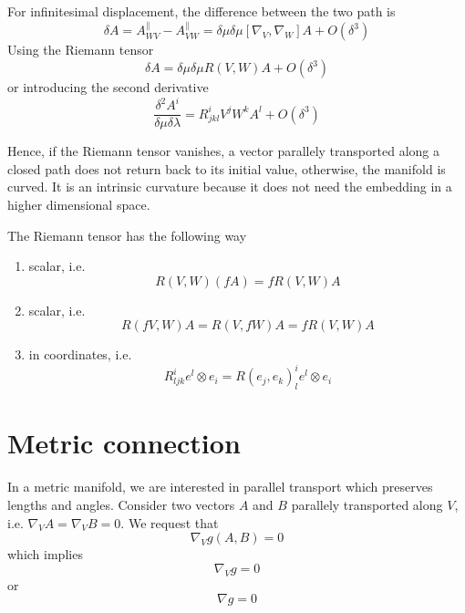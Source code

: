     For infinitesimal displacement, the difference between the two path is 
    \begin{equation*}
        \delta A = A^\parallel_{WV} - A^\parallel_{VW} = \delta \mu \delta \mu [\nabla_V, \nabla_W] A + O(\delta^3)
    \end{equation*}
    Using the Riemann tensor 
    \begin{equation*}
        \delta A = \delta \mu \delta \mu R(V,W) A + O(\delta^3)
    \end{equation*}
    or introducing the second derivative 
    \begin{equation*}
        \frac{\delta^2 A^i}{\delta \mu \delta \lambda} = R^i_{jkl} V^j W^k A^l + O(\delta^3)
    \end{equation*}

    Hence, if the Riemann tensor vanishes, a vector parallely transported along a closed path does not return back to its initial value, otherwise, the manifold is curved. It is an intrinsic curvature because it does not need the embedding in a higher dimensional space. 

    The Riemann tensor has the following way 
    \begin{enumerate}
        \item scalar, i.e. 
            \begin{equation*}
                R(V,W) (fA) = f R(V, W) A
            \end{equation*}
        \item scalar, i.e. 
            \begin{equation*}
                R(fV,W) A = R(V, fW) A = f R(V, W) A
            \end{equation*}
        \item in coordinates, i.e. 
            \begin{equation*}
                R^i_{ljk} e^l \otimes e_i = R(e_j, e_k)^i_l e^l \otimes e_i
            \end{equation*}
    \end{enumerate}

\section{Metric connection}

    In a metric manifold, we are interested in parallel transport which preserves lengths and angles. Consider two vectors $A$ and $B$ parallely transported along $V$, i.e. $\nabla_V A = \nabla_V B = 0$. We request that 
    \begin{equation*}
        \nabla_V g(A,B) = 0
    \end{equation*}
    which implies
    \begin{equation*}
        \nabla_V g = 0
    \end{equation*}
    or 
    \begin{equation}\label{metconn}
        \nabla g = 0
    \end{equation}

